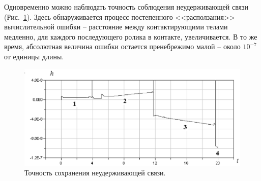 Одновременно можно наблюдать точность соблюдения неудерживающей связи 
(Рис.~\ref{fig2}). Здесь обнаруживается процесс постепенного <<расползания>>
вычислительной ошибки -- расстояние между контактирующими телами медленно, для
каждого последующего ролика в контакте, увеличивается. В то же время, 
абсолютная величина ошибки остается пренебрежимо малой -- около $10^{-7}$
от единицы длины.

\begin{figure}[htb]
\centerline{\includegraphics[width=15cm]{content/parts/3_friction/nd/Figure21.eps}}
\caption{Точность сохранения неудерживающей связи.}
\label{fig2}
\end{figure}
